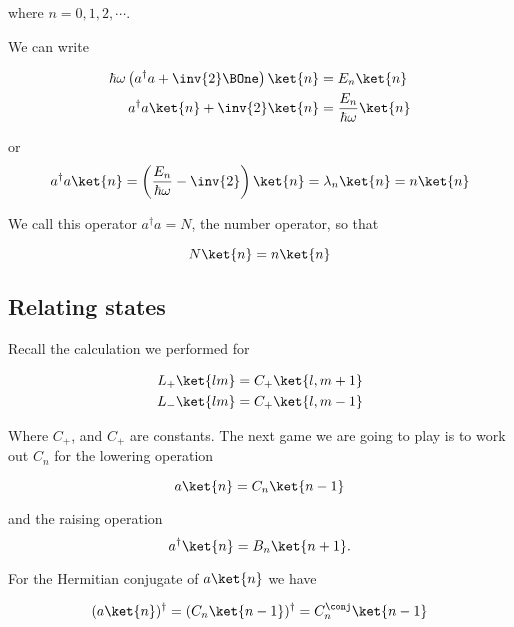 where $n = 0, 1, 2, \cdots$.

We can write

\begin{align*}
\hbar \omega \left( a^\dagger a + \inv{2} \BOne \right) \ket{n} &= E_n \ket{n} \\
a^\dagger a \ket{n} + \inv{2} \ket{n} &= \frac{E_n}{\hbar \omega} \ket{n} \\
\end{align*}

or
\begin{equation}\label{eqn:PHY356FLecture11:170}
a^\dagger a \ket{n} = \left( \frac{E_n}{\hbar \omega} - \inv{2} \right) \ket{n} = \lambda_n \ket{n} = n \ket{n}
\end{equation}

We call this operator $a^\dagger a = N$, the number operator, so that

\begin{equation}\label{eqn:PHY356FLecture11:180}
N \ket{n} = n \ket{n}
\end{equation}

\subsection{Relating states}

Recall the calculation we performed for

\begin{align}\label{eqn:PHY356FLecture11:200}
L_{+} \ket{lm} &= C_{+} \ket{l, m+1} \\
L_{-} \ket{lm} &= C_{+} \ket{l, m-1}
\end{align}

Where $C_{+}$, and $C_{+}$ are constants.  The next game we are going to play is to work out $C_n$ for the lowering operation

\begin{equation}\label{eqn:PHY356FLecture11:210}
a\ket{n} = C_n \ket{n-1}
\end{equation}

and the raising operation
\begin{equation}\label{eqn:PHY356FLecture11:211}
a^\dagger \ket{n} = B_n \ket{n+1}.
\end{equation}

For the Hermitian conjugate of $a \ket{n}$ we have

\begin{equation}\label{eqn:PHY356FLecture11:220}
(a \ket{n})^\dagger = ( C_n \ket{n-1} )^\dagger = C_n^\conj \ket{n-1}
\end{equation}


